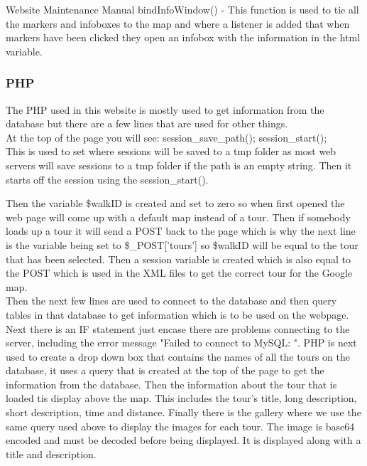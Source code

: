 \documentclass{article}
\begin{document}
\begin{section}{Website Maintenance Manual}
bindInfoWindow() -  This function is used to tie all the markers and infoboxes to the map and where a listener is added that when markers have been clicked  they open an infobox with the information in the html variable.

		\subsubsection{PHP}
		The PHP used in this website is mostly used to get information from the database but there are a few lines that are used for other things. \\

		At the top of the page you will see: session\_save\_path(); session\_start(); \\
This is used to set where sessions will be saved to a tmp folder as most web servers will save sessions to a tmp folder if the path is an empty string. Then it starts off the session using the session\_start().

		Then the variable \$walkID is created and set to zero so when first opened the web page will come up with a default map instead of a tour. Then if somebody loads up a tour it will send a POST back to the page which is why the next line is the variable being set to \$\_POST['tours'] so \$walkID will be equal to the tour that has been selected. Then a session variable is created which is also equal to the POST which is used in the XML files to get the correct tour for the Google map. \\

		Then the next few lines are used to connect to the database and then query tables in that database to get information which is to be used on the webpage. Next there is an IF statement just encase there are problems connecting to the server, including the error message "Failed to connect to MySQL: ".
PHP is next used to create a drop down box that contains the names of all the tours on the database, it uses a query that is created at the top of the page to get the information from the database.
Then the information about the tour that is loaded tis display above the map. This includes the tour's title, long description, short description, time and distance.
Finally there is the gallery where we use the same query used above to display the images for each tour. The image is base64 encoded and must be decoded before being displayed. It is displayed along with a title and description.


\end{section}
\end{document}
